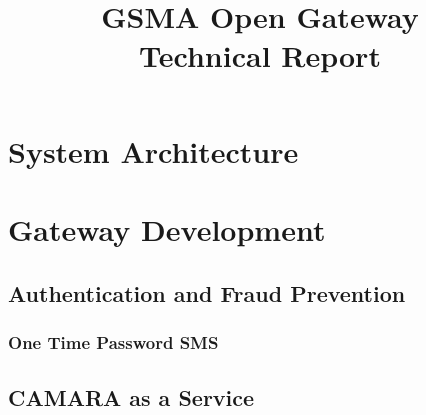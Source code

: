 \documentclass[code,math,bibliography]{relatorio-deti}
\title{GSMA Open Gateway\\[20pt]Technical Report}
\begin{document}
\maketitle

%
%



\tableofcontents

\clearpage







\chapter{System Architecture}

\chapter{Gateway Development}




\section{Authentication and Fraud Prevention}
\subsection{One Time Password SMS}
\section{CAMARA as a Service}







\printbibliography[heading=bibintoc]
\end{document}
